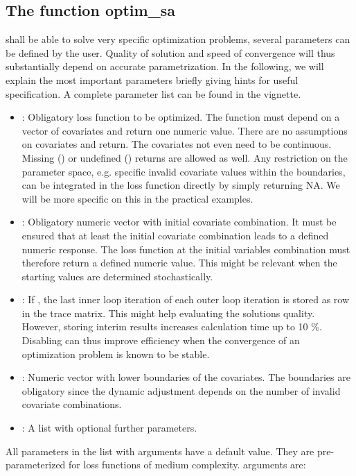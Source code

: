 \subsection{The function optim\_sa}
 shall be able to solve very specific optimization problems, several parameters can be defined by the user. Quality of solution and speed of convergence will thus substantially depend on accurate parametrization. In the following, we will explain the most important parameters briefly giving hints for useful specification. A complete parameter list can be found in the vignette.
\begin{itemize}
\item {}: Obligatory loss function to be optimized. The function must depend on a vector of covariates and return one numeric value. There are no assumptions on covariates and return. The covariates not even need to be continuous. Missing () or undefined () returns are allowed as well. Any restriction on the parameter space, e.g. specific invalid covariate values within the boundaries, can be integrated in the loss function directly by simply returning NA. We will be more specific on this in the practical examples.
\item {}: Obligatory numeric vector with initial covariate combination. It must be ensured that at least the initial covariate combination leads to a defined numeric response. The loss function at the initial variables combination must therefore return a defined numeric value. This might be relevant when the starting values are determined stochastically.
\item {}: If , the last inner loop iteration of each outer loop iteration is stored as row in the trace matrix. This might help evaluating the solutions quality. However, storing interim results increases calculation time up to 10 \%. Disabling  can thus improve efficiency when the convergence of an optimization problem is known to be stable.
\item {}: Numeric vector with lower boundaries of the covariates. The boundaries are obligatory since the dynamic  adjustment \citep{corana_1987, pronzato_1984} depends on the number of invalid covariate combinations.
\item {}: A list with optional further parameters.
\end{itemize}
All parameters in the list with  arguments have a default value. They are pre-parameterized for loss functions of medium complexity.  arguments are:
